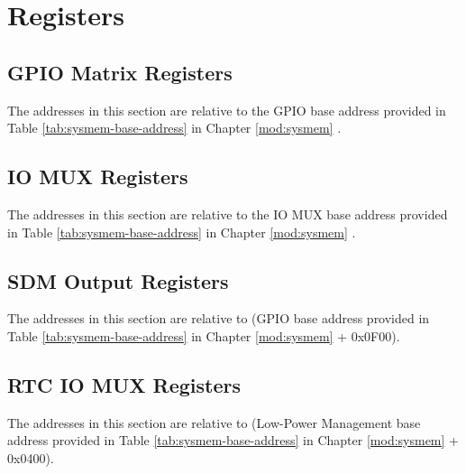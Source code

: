 \documentclass[main\_\_EN.tex]{subfiles}
\begin{document}


\section{Registers}

\subsection{GPIO Matrix Registers}
The addresses in this section are relative to the GPIO base address provided in Table \ref{tab:sysmem-base-address} in Chapter \ref{mod:sysmem} \textit{}.



\subsection{IO MUX Registers}
The addresses in this section are relative to the IO MUX base address provided in Table \ref{tab:sysmem-base-address} in Chapter \ref{mod:sysmem} \textit{}.


\subsection{SDM Output Registers}
The addresses in this section are relative to (GPIO base address provided in Table \ref{tab:sysmem-base-address} in Chapter \ref{mod:sysmem} \textit{} + 0x{}0F00).



\subsection{RTC IO MUX Registers}
The addresses in this section are relative to (Low-Power Management base address provided in Table \ref{tab:sysmem-base-address} in Chapter \ref{mod:sysmem} \textit{} + 0x{}0400).

\end{document}
